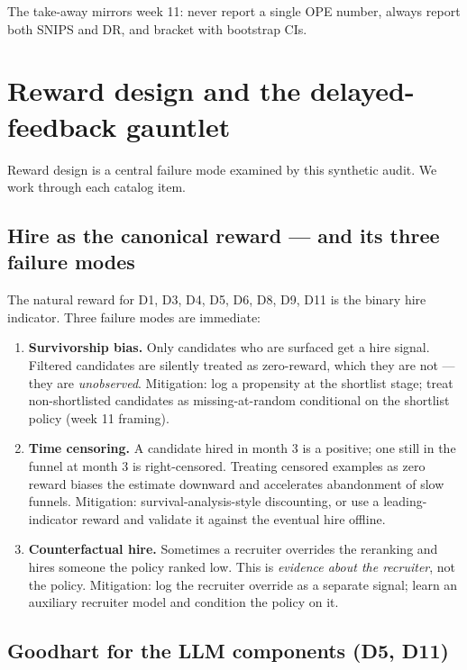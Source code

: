 \documentclass[11pt,oneside]{scrbook}
\begin{document}
The take-away mirrors week 11: never report a single OPE number, always
report both SNIPS and DR, and bracket with bootstrap CIs.

\chapter{Reward design and the delayed-feedback gauntlet}

Reward design is a central failure mode examined by this synthetic audit. We work
through each catalog item.

\section{Hire as the canonical reward --- and its three failure modes}

The natural reward for D1, D3, D4, D5, D6, D8, D9, D11 is the binary
hire indicator. Three failure modes are immediate:

\begin{enumerate}
  \item \textbf{Survivorship bias.} Only candidates who are surfaced get
        a hire signal. Filtered candidates are silently treated as
        zero-reward, which they are not --- they are \emph{unobserved}.
        Mitigation: log a propensity at the shortlist stage; treat
        non-shortlisted candidates as missing-at-random conditional on
        the shortlist policy (week 11 framing).
  \item \textbf{Time censoring.} A candidate hired in month 3 is a
        positive; one still in the funnel at month 3 is right-censored.
        Treating censored examples as zero reward biases the estimate
        downward and accelerates abandonment of slow funnels.
        Mitigation: survival-analysis-style discounting, or use a
        leading-indicator reward and validate it against the eventual
        hire offline.
  \item \textbf{Counterfactual hire.} Sometimes a recruiter overrides the
        reranking and hires someone the policy ranked low. This is
        \emph{evidence about the recruiter}, not the policy. Mitigation:
        log the recruiter override as a separate signal; learn an
        auxiliary recruiter model and condition the policy on it.
\end{enumerate}

\section{Goodhart for the LLM components (D5, D11)}
\end{document}
